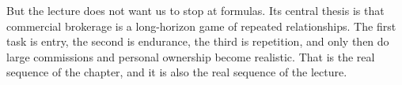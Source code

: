 But the lecture does not want us to stop at formulas. Its central thesis is that commercial brokerage is a long-horizon game of repeated relationships. The first task is entry, the second is endurance, the third is repetition, and only then do large commissions and personal ownership become realistic. That is the real sequence of the chapter, and it is also the real sequence of the lecture.
